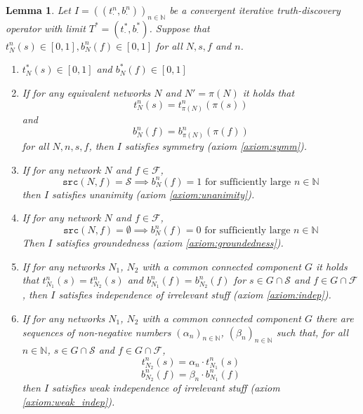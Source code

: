 \documentclass{article}
\theoremstyle{definition} \newtheorem{definition}{Definition}
\theoremstyle{definition} \newtheorem{example}{Example}
\theoremstyle{plain} \newtheorem{axiom}{Axiom}
\theoremstyle{plain} \newtheorem*{remark}{Remark}
\theoremstyle{remark} \newtheorem*{notation}{Notation}
\theoremstyle{plain} \newtheorem{lemma}{Lemma}
\theoremstyle{plain} \newtheorem{theorem}{Theorem}
\theoremstyle{plain} \newtheorem{proposition}{Proposition}
\renewcommand{\S}{\mathcal{S}}  %
\newcommand{\F}{\mathcal{F}}
\newcommand{\Nat}{\mathbb{N}}
\newcommand{\src}{\texttt{src}}
\newcommand{\pl}{\cdot}  %
\begin{document}
\begin{lemma}
\label{lemma:iterative_axiom_suff_conds}
Let $I=((t_\pl^n, b_\pl^n))_{n \in \Nat}$ be a convergent iterative
truth-discovery operator with limit $T^*=(t_\pl^*, b_\pl^*)$. Suppose that
$t_N^n(s) \in [0, 1], b_N^n(f) \in [0, 1]$ for all $N, s, f$ and $n$.

\begin{enumerate}
    \item $t_N^*(s) \in [0, 1]$ and $b_N^*(f) \in [0, 1]$

    \item If for any equivalent networks $N$ and $N'=\pi(N)$ it holds that
    \[
        t_N^n(s) = t_{\pi(N)}^n(\pi(s))
    \]
    and
    \[
        b_N^n(f) = b_{\pi(N)}^n(\pi(f))
    \]
    for all $N, n, s, f$, then $I$ satisfies symmetry (axiom \ref{axiom:symm}).

    \item If for any network $N$ and $f \in \F$,
    \[
        \src(N, f) = \S \implies b_N^n(f) = 1 \text{ for sufficiently large }
            n \in \Nat
    \]
    then $I$ satisfies unanimity (axiom \ref{axiom:unanimity}).

    \item If for any network $N$ and $f \in \F$,
    \[
        \src(N, f) = \emptyset \implies b_N^n(f) = 0
            \text{ for sufficiently large } n \in \Nat
    \]
    Then $I$ satisfies groundedness (axiom \ref{axiom:groundedness}).

    \item If for any networks $N_1$, $N_2$ with a common connected component
    $G$ it holds that $t_{N_1}^n(s) = t_{N_2}^n(s)$ and $b_{N_1}^n(f) =
    b_{N_2}^n(f)$ for $s \in G \cap \S$ and $f \in G \cap \F$, then $I$
    satisfies independence of irrelevant stuff (axiom \ref{axiom:indep}).

    \item If for any networks $N_1$, $N_2$ with a common connected component
    $G$ there are sequences of non-negative numbers $(\alpha_n)_{n \in \Nat}$,
    $(\beta_n)_{n \in \Nat}$ such that, for all $n \in \Nat$, $s \in G \cap \S$
    and $f \in G \cap \F$,
        \[ t_{N_2}^n(s) = \alpha_n \cdot t_{N_1}^n(s) \]
        \[ b_{N_2}^n(f) = \beta_n \cdot b_{N_1}^n(f) \]
    then $I$ satisfies weak independence of irrelevant stuff (axiom
    \ref{axiom:weak_indep}).

\end{enumerate}
\end{lemma}
\end{document}
